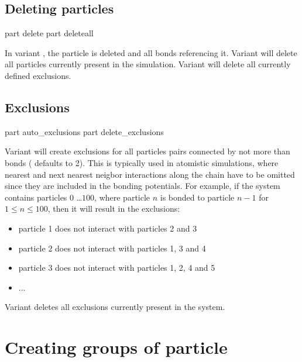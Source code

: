 \subsection{Deleting  particles}
\label{tcl:part:delete}

\begin{essyntax}
   part  delete
   part deleteall
\end{essyntax}

In variant , the particle  is deleted
and all bonds referencing it.  Variant  will delete all
particles currently present in the simulation. Variant 
will delete all currently defined exclusions.

\subsection{Exclusions}

\begin{essyntax}
   part auto_exclusions 
   part delete_exclusions
\end{essyntax}

Variant  will create exclusions for all particles pairs
connected by not more than  bonds ( defaults to
2). This is typically used in atomistic simulations, where nearest and
next nearest neigbor interactions along the chain have to be omitted
since they are included in the bonding potentials. For example, if the
system contains particles $0$ \dots $100$, where particle $n$ is
bonded to particle $n-1$ for $1 \leq n \leq 100$, then it will result
in the exclusions:
\begin{itemize}
  \item particle 1 does not interact with particles 2 and 3
  \item particle 2 does not interact with particles 1, 3 and 4
  \item particle 3 does not interact with particles 1, 2, 4 and 5
  \item ...
\end{itemize}

Variant  deletes all exclusions currently present in the
system.

\section{Creating groups of particle}

